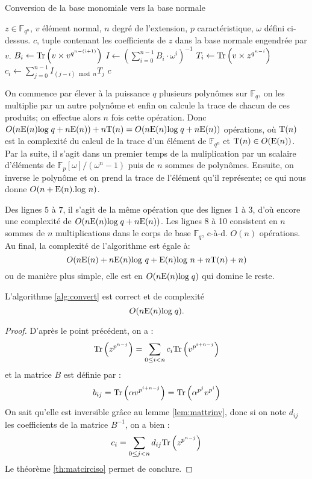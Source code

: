 \documentclass[a4paper]{article} %
\numberwithin{section}{part}
\numberwithin{equation}{section}
\newcommand\GF[1]{\mathbb{F}_{#1}}
\newcommand\Tr[1]{\textup{Tr}\left(#1\right)}
\newcommand\E[1]{\textup{E}(#1)}
\begin{document}
\begin{algorithm}
\caption{Conversion de la base monomiale vers la base normale}
\label{alg:convert}
\begin{algorithmic}[1]
\REQUIRE $z\in\GF{q^n}$, $v$ élément normal, $n$ degré de l'extension, $p$ 
caractéristique, $\omega$ défini ci-dessus.
\ENSURE $c$, tuple contenant les coefficients de $z$ dans la base 
normale engendrée par $v$.
\bigskip
{}
    \STATE $B_i \leftarrow \Tr{v\times v^{q^{n-(i+1)}}}$
\ENDFOR
\STATE $I \leftarrow (\sum_{i = 0}^{n-1}{B_i\cdot \omega^i})^{-1}$
    \STATE $T_i \leftarrow \Tr{v\times z^{q^{n-i}}}$
\ENDFOR
{}
    \STATE $c_i \leftarrow \sum_{j=0}^{n-1}{I_{(j-i)\bmod n}T_j}$
\ENDFOR
\RETURN $c$

\end{algorithmic}
\end{algorithm}
On commence par élever à la puissance $q$ plusieurs polynômes sur $\GF{q}$, 
on les multiplie par un autre polynôme et enfin on calcule la trace de chacun 
de ces produits; on effectue alors $n$ fois cette opération. Donc 
$O(n\E{n}\textup{log}\;q + n\E{n}) + n\textup{T}(n) = O(n\E{n}\textup{log}\;q + 
n\E{n})$ opérations, 
où $\textup{T}(n)$ est la complexité du calcul de la trace d'un élément
de $\GF{q^n}$ et $\textup{T}(n) \in O(\E{n})$.
Par la suite, il s'agit dans un premier temps de la muliplication par un 
scalaire d'éléments de $\mathbb{F}_p[\omega]/(\omega^n - 1)$ puis de $n$ sommes 
de polynômes. Ensuite, on inverse le polynôme et on prend la trace de l'élément 
qu'il représente; ce qui nous donne $O(n + \E{n}.\textup{log }n)$.\par
Des lignes $5$ à $7$, il s'agit de la même opération que des lignes 1 à 3, d'où 
encore une complexité de $O(n\E{n}\textup{log}\;q + n\E{n})$.
Les lignes 8 à 10 consistent en $n$ sommes de $n$ multiplications dans le corps 
de base $\GF{q}$, c-à-d. $O(n)$ opérations.
Au final, la complexité de l'algorithme est égale à:
\[O(n\E{n} + n\E{n}\textup{log }q +  \E{n}\textup{log }n + n\textup{T}(n) + n)\]
ou de manière plus simple, elle est en $O(n\E{n}\textup{log}\;q)$ qui domine le 
reste.

\begin{prop}
\label{prop:algconvert}
L'algorithme \ref{alg:convert} est correct et de complexité
\begin{equation}
O(n\E{n}\textup{log}\;q).
\end{equation}
\end{prop}
\begin{proof}
D'après le point précédent, on a :
\[\textup{Tr}\left(z^{p^{n-j}}\right) = \sum_{0\leq i < n}{c_i\textup{Tr}
\left(v^{p^{i+n-j}}\right)}\]
et la matrice $B$ est définie par :
\[b_{ij} = \Tr{\alpha v^{p^{i+n-j}}} = \Tr{\alpha^{p^j}v^{p^i}}\]
On sait qu'elle est inversible grâce au lemme \ref{lem:mattrinv}, donc si on
note $d_{ij}$ les coefficients de la matrice $B^{-1}$, on a bien :
\[c_i = \sum_{0\leq j < n}{d_{ij}\textup{Tr}\left(z^{p^{n-j}}\right)}\]
Le théorème \ref{th:matcirciso} permet de conclure.
\end{proof}
\end{document}
